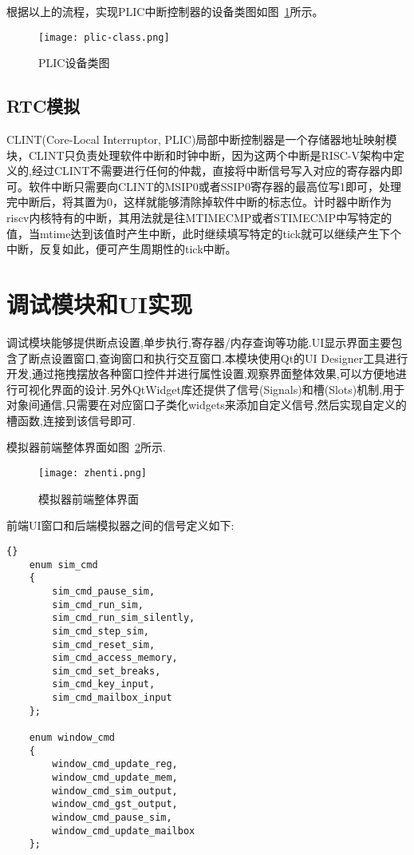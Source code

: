根据以上的流程，实现PLIC中断控制器的设备类图如图~\ref{fig:plic-class}所示。
\begin{figure}[h]
    \centering
    \texttt{[image: plic-class.png]}
    \caption{PLIC设备类图}
    \label{fig:plic-class}
\end{figure}


\subsection{RTC模拟}

CLINT(Core-Local Interruptor, PLIC)局部中断控制器是一个存储器地址映射模块，CLINT只负责处理软件中断和时钟中断，因为这两个中断是RISC-V架构中定义的,经过CLINT不需要进行任何的仲裁，直接将中断信号写入对应的寄存器内即可。软件中断只需要向CLINT的MSIP0或者SSIP0寄存器的最高位写1即可，处理完中断后，将其置为0，这样就能够清除掉软件中断的标志位。计时器中断作为riscv内核特有的中断，其用法就是往MTIMECMP或者STIMECMP中写特定的值，当mtime达到该值时产生中断，此时继续填写特定的tick就可以继续产生下个中断，反复如此，便可产生周期性的tick中断。



\section{调试模块和UI实现}
调试模块能够提供断点设置,单步执行,寄存器/内存查询等功能.UI显示界面主要包含了断点设置窗口,查询窗口和执行交互窗口.本模块使用Qt的UI Designer工具进行开发,通过拖拽摆放各种窗口控件并进行属性设置,观察界面整体效果,可以方便地进行可视化界面的设计.另外QtWidget库还提供了信号(Signals)和槽(Slots)机制,用于对象间通信,只需要在对应窗口子类化widgets来添加自定义信号,然后实现自定义的槽函数,连接到该信号即可.


模拟器前端整体界面如图~\ref{fig:zhenti}所示.
\begin{figure}[h]
    \centering
    \texttt{[image: zhenti.png]}
    \caption{模拟器前端整体界面}
    \label{fig:zhenti}
  \end{figure}


前端UI窗口和后端模拟器之间的信号定义如下:
\begin{lstlisting}{}
    enum sim_cmd
    {
        sim_cmd_pause_sim,
        sim_cmd_run_sim,
        sim_cmd_run_sim_silently,
        sim_cmd_step_sim,
        sim_cmd_reset_sim,
        sim_cmd_access_memory,
        sim_cmd_set_breaks,
        sim_cmd_key_input,
        sim_cmd_mailbox_input
    };
    
    enum window_cmd
    {
        window_cmd_update_reg,
        window_cmd_update_mem,
        window_cmd_sim_output,
        window_cmd_gst_output,
        window_cmd_pause_sim,
        window_cmd_update_mailbox
    };          
\end{lstlisting}

